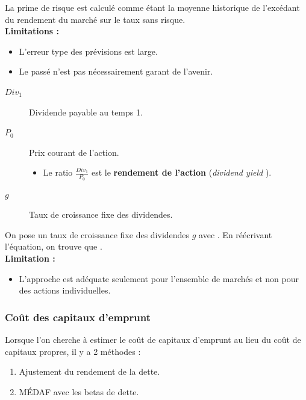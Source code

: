 \documentclass[10pt, french]{article}
\begin{document}
\begin{multicols*}{2}
\begin{definitionNOHFILLprop}
La prime de risque est calculé comme étant la moyenne historique de l'excédant du rendement du marché sur le taux sans risque.\\

\textbf{Limitations :}
\begin{itemize}
	\item	L'erreur type des prévisions est large.
	\item	Le passé n'est pas nécessairement garant de l'avenir.
\end{itemize}
\end{definitionNOHFILLprop}

\begin{definitionNOHFILLprop}
\begin{distributions}[Notation]
\begin{description}
	\item[$Div_{1}$]	Dividende payable au temps 1.
	\item[$P_{0}$]	Prix courant de l'action.
		\begin{itemize}
		\item	Le ratio $\frac{Div_{1}}{P_{0}}$ est le \textbf{rendement de l'action} (\og \textit{dividend yield} \fg{}).
		\end{itemize}
	\item[$g$]	Taux de croissance fixe des dividendes.
\end{description}
\end{distributions}

On pose un taux de croissance fixe des dividendes $g$ avec . En réécrivant l'équation, on trouve que .\\

\textbf{Limitation :}
\begin{itemize}
	\item	L'approche est adéquate seulement pour l'ensemble de marchés et non pour des actions individuelles.
\end{itemize}
\end{definitionNOHFILLprop}



\columnbreak
\subsubsection{Coût des capitaux d'emprunt}
Lorsque l'on cherche à estimer le coût de capitaux d'emprunt au lieu du coût de capitaux propres, il y a 2 méthodes : 
\begin{enumerate}
	\item	Ajustement du rendement de la dette.
	\item	MÉDAF avec les betas de dette.
\end{enumerate}


\end{multicols*}
\end{document}
